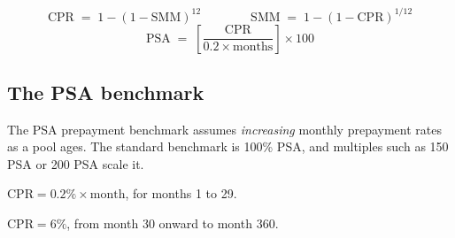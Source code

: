 \begin{crfmlbox}
\[ \mathrm{CPR} \;=\; 1-(1-\mathrm{SMM})^{12}
   \qquad\qquad
   \mathrm{SMM} \;=\; 1-(1-\mathrm{CPR})^{1/12} \]
\[ \mathrm{PSA} \;=\; \left[\frac{\mathrm{CPR}}{0.2 \times \text{months}}\right]
   \times 100 \]
\end{crfmlbox}

\subsection*{The PSA benchmark}

The PSA prepayment benchmark assumes \emph{increasing} monthly prepayment rates as
a pool ages. The standard benchmark is 100\% PSA, and multiples such as 150 PSA or
200 PSA scale it.

\begin{crkeybox}
$\mathrm{CPR} = 0.2\% \times \text{month}$, for months 1 to 29.

\smallskip
$\mathrm{CPR} = 6\%$, from month 30 onward to month 360.
\end{crkeybox}

